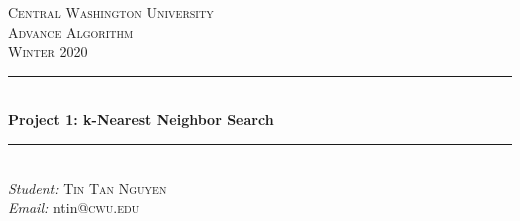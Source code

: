 \documentclass[12pt]{article}
\begin{document}
    
    \begin{titlepage}
        
        \newcommand{\HRule}{\rule{\linewidth}{0.5mm}} %
        
        \center %
        
        
        \textsc{\large Central Washington University}\\[1.5cm] %
        \textsc{\Large Advance Algorithm}\\[0.5cm] %
        \textsc{\large Winter 2020}\\[0.5cm] %
        
        
        \HRule \\[0.5cm]
        { \LARGE \bfseries Project 1: k-Nearest Neighbor Search}\\[0.2cm] %
        \HRule \\[0.5cm]
        
        
                \emph{Student:}
                    \textsc {\large Tin Tan Nguyen} \\			
                 \emph{Email:}   ntin\textsc{@cwu.edu}\\
        ~
        

\end{titlepage}
\end{document}
